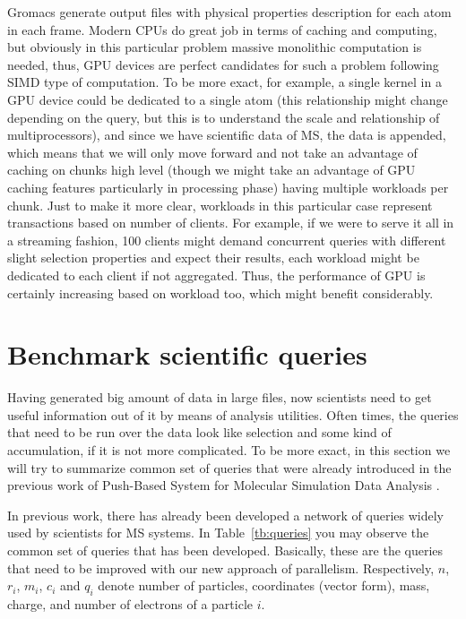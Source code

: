 \documentclass[12pt,letterpaper]{report}
\begin{document}
Gromacs generate output files with physical properties description for each atom in each frame. Modern CPUs do great job in terms of caching and computing, but obviously in this particular problem massive monolithic computation is needed, thus, GPU devices are perfect candidates for such a problem following SIMD type of computation. To be more exact, for example, a single kernel in a GPU device could be dedicated to a single atom (this relationship might change depending on the query, but this is to understand the scale and relationship of multiprocessors), and since we have scientific data of MS, the data is appended, which means that we will only move forward and not take an advantage of caching on chunks high level (though we might take an advantage of GPU caching features particularly in processing phase) having multiple workloads per chunk. Just to make it more clear, workloads in this particular case represent transactions based on number of clients. For example, if we were to serve it all in a streaming fashion, 100 clients might demand concurrent queries with different slight selection properties and expect their results, each workload might be dedicated to each client if not aggregated. Thus, the performance of GPU is certainly increasing based on workload too, which might benefit considerably.


\chapter{Benchmark scientific queries}\label{sc:querynetwork}
\hspace{3em} Having generated big amount of data in large files, now scientists need to get useful information out of it by means of analysis utilities. Often times, the queries that need to be run over the data look like selection and some kind of accumulation, if it is not more complicated. To be more exact, in this section we will try to summarize common set of queries that were already introduced in the previous work of Push-Based System for Molecular Simulation Data Analysis \cite{mainPaper}. 

In previous work, there has already been developed a network of queries widely used by scientists for MS systems. In Table~\ref{tb:queries} you may observe the common set of queries that has been developed. Basically, these are the queries that need to be improved with our new approach of parallelism. Respectively, $n$, $r_i$, $m_i$, $c_i$ and $q_i$ denote number of particles, coordinates (vector form), mass, charge, and number of electrons of a particle $i$.
\end{document}

